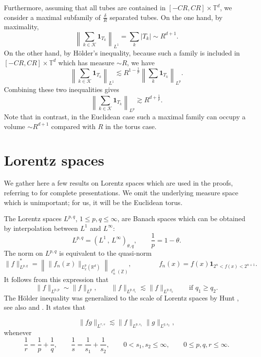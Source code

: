 \documentclass[11pt,a4paper,reqno]{amsart}
\theoremstyle{plain}
\theoremstyle{remark}
\begin{document}
Furthermore, assuming that all tubes are contained in $[-CR,CR] \times \mathbb{T}^d$, we consider a maximal subfamily of $\frac{\delta}{R}$ separated tubes.  
On the one hand, by maximality,
\[
    \left\| \sum_{k\in \mathcal{K}} \mathbf{1}_{T_k} \right\|_{L^1} = \sum_k |T_k| \sim R^{d+1}.
\]
On the other hand, by H\"older's inequality, because such a family is included in $[-CR,CR] \times \mathbb{T}^d$ which has measure $\sim R$, we have
\[
    \left\| \sum_{k\in \mathcal{K}} \mathbf{1}_{T_k} \right\|_{L^1} \lesssim R^{1-\frac{1}{p}}  \left\| \sum_k \mathbf{1}_{T_k} \right\|_{L^p}.
\]
Combining these two inequalities gives
\[
    \left\| \sum_{k\in \mathcal{K}} \mathbf{1}_{T_k} \right\|_{L^p} \gtrsim R^{d+\frac 1p}.
\]
Note that in contrast, in the Euclidean case such a maximal family can occupy a volume $\sim R^{d+1}$ compared with $R$ in the torus case.


\appendix

\section{Lorentz spaces}
We gather here a few results on Lorentz spaces which are used in the proofs, referring to \cite{BerghLofstrom,Visan} for complete presentations. We omit the underlying measure space which is unimportant; for us, it will be the Euclidean torus.

The Lorentz spaces $L^{p,q}$, $1 \leq p,q \leq \infty$, are Banach spaces which can be obtained by interpolation \cite[Theorem 5.3.1]{BerghLofstrom} between $L^1$ and $L^\infty$:
\begin{equation}
    \label{eq.interpolation-lorentz1}
    L^{p,q} = (L^1\,,\,L^\infty)_{\theta,q}, \qquad \frac{1}{p} = 1 - \theta. 
\end{equation}
The norm on $L^{p,q}$ is equivalent to the quasi-norm
\[
    \|f \|_{L^{p,q}}^* = \left\| \| f_n(x) \|_{L^p_x(\mathbb{R}^d)} \right\|_{\ell^q_n(\mathbb{Z})}, \qquad \qquad f_n(x) = f(x) \mathbf{1}_{2^n < f(x) < 2^{n+1}}.
\]
It follows from this expression that
\[
    \| f \|_{L^{p,p}} \sim \| f\|_{L^p}, \qquad \| f \|_{L^{p,q_1}} \lesssim \| f \|_{L^{p,q_2}} \qquad \mbox{if $q_1 \geq q_2$}.
\]
The Hölder inequality was generalized to the scale of Lorentz spaces by Hunt \cite{Hunt}, see also \cite{Oneil1963} and \cite[p. 73]{grafakos2011classical}. It states that


\begin{equation}
    \label{holder-oneil}
        \|fg\|_{L^{r,s}} \lesssim \|f\|_{L^{p,s_1}}\|g\|_{L^{q,s_2}},
\end{equation}
whenever
\[
 \frac{1}{r}=\frac{1}{p} + \frac{1}{q}, \qquad  \frac{1}{s} = \frac{1}{s_1} + \frac{1}{s_2}, \qquad 0<s_1,s_2 \leq \infty, \qquad  0 \leq p,q,r \leq \infty.
\]
\end{document}
